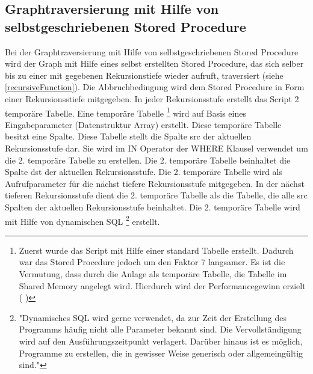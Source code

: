 \subsection{Graphtraversierung mit Hilfe von selbstgeschriebenen Stored Procedure}
Bei der Graphtraversierung mit Hilfe von selbstgeschriebenen Stored Procedure wird der Graph mit Hilfe eines selbst erstellten Stored Procedure, das sich selber bis
zu einer mit gegebenen Rekursionstiefe wieder aufruft, traversiert (siehe \ref{recursiveFunction}). Die Abbruchbedingung wird dem Stored Procedure in Form einer
Rekursionsstiefe mitgegeben. In jeder Rekursionsstufe erstellt das Script 2 temporäre Tabelle. Eine temporäre Tabelle \footnote{Zuerst wurde das Script mit Hilfe einer standard Tabelle
erstellt. Dadurch war das Stored Procedure jedoch um den Faktor 7 langsamer. Es ist die Vermutung, dass durch die Anlage als temporäre Tabelle, die Tabelle im Shared Memory angelegt wird.
Hierdurch wird der Performancegewinn erzielt ( \cite[S.26]{froehlich01})}
wird auf Basis eines Eingabeparameter (Datenstruktur Array) erstellt.
Diese temporäre Tabelle besitzt eine Spalte. Diese Tabelle stellt die Spalte src der aktuellen Rekursionsstufe dar. Sie wird im IN Operator der WHERE Klausel verwendet
um die 2. temporäre Tabelle zu erstellen. Die 2. temporäre Tabelle beinhaltet die Spalte dst der aktuellen Rekursionsstufe. Die 2. temporäre Tabelle wird als
Aufrufparameter für die nächst tiefere Rekursionsstufe mitgegeben. In der nächst tieferen Rekursionsstufe dient die 2. temporäre Tabelle als die Tabelle, die alle
src Spalten der aktuellen Rekursionsstufe beinhaltet. Die 2. temporäre Tabelle wird mit Hilfe von dynamischen \ac{SQL} \footnote{"Dynamisches SQL wird gerne verwendet,
da zur Zeit der Erstellung des Programms häufig nicht alle Parameter bekannt sind. Die Vervollständigung wird auf den Ausführungszeitpunkt verlagert. Darüber hinaus
ist es möglich, Programme zu erstellen, die in gewisser Weise generisch oder allgemeingültig sind."\cite[S.316 - 317]{froehlich01}} erstellt.

